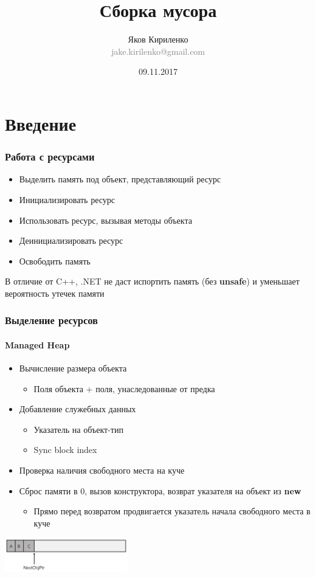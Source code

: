 \documentclass[xetex,mathserif,serif]{beamer}
\title{Сборка мусора}
\author[Яков Кириленко]{Яков Кириленко\\\small{\textcolor{gray}{jake.kirilenko@gmail.com}}}
\date{09.11.2017}
\begin{document}
	\frame{\titlepage}

	\section{Введение}

	\begin{frame}
		\frametitle{Работа с ресурсами}
		\begin{itemize}
			\item Выделить память под объект, представляющий ресурс
			\item Инициализировать ресурс
			\item Использовать ресурс, вызывая методы объекта
			\item Деинициализировать ресурс
			\item Освободить память
		\end{itemize}
		В отличие от C++, .NET не даст испортить память (без \textbf{unsafe}) и уменьшает вероятность утечек памяти
	\end{frame}

	\begin{frame}
		\frametitle{Выделение ресурсов}
		\framesubtitle{Managed Heap}
		\begin{itemize}
			\item Вычисление размера объекта
			\begin{itemize}
				\item Поля объекта + поля, унаследованные от предка
			\end{itemize}
			\item Добавление служебных данных
			\begin{itemize}
				\item Указатель на объект-тип
				\item Sync block index
			\end{itemize}
			\item Проверка наличия свободного места на куче
			\item Сброс памяти в 0, вызов конструктора, возврат указателя на объект из \textbf{new}
			\begin{itemize}
				\item Прямо перед возвратом продвигается указатель начала свободного места в куче
			\end{itemize}
		\end{itemize}
		\begin{center}
			\includegraphics[width=0.4\textwidth]{heapAllocation.png}
		\end{center}
	\end{frame}
\end{document}

